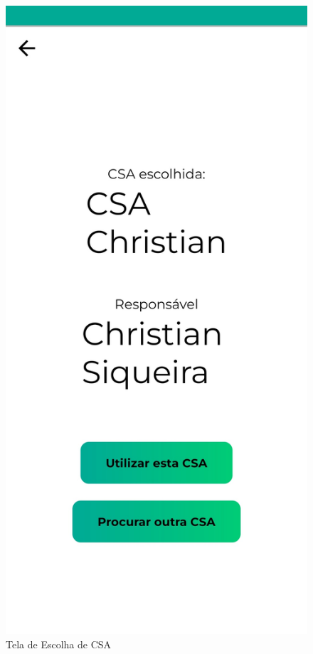 \begin{figure}[h]
	\centering
	\includegraphics[keepaspectratio=true,scale=0.16]{figuras/seleciona_csa.jpg}
	\caption{Tela de Escolha de CSA}
        \label{tela-escolhe-csa-app}
\end{figure}

